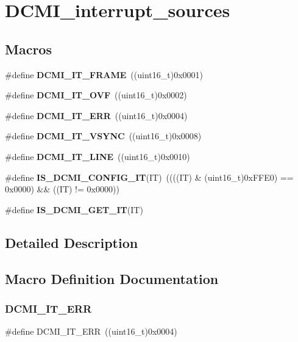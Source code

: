 \section{D\+C\+M\+I\+\_\+interrupt\+\_\+sources}
\label{group__DCMI__interrupt__sources}
\subsection*{Macros}
\begin{DoxyCompactItemize}
\item 
\#define \textbf{ D\+C\+M\+I\+\_\+\+I\+T\+\_\+\+F\+R\+A\+ME}~((uint16\+\_\+t)0x0001)
\item 
\#define \textbf{ D\+C\+M\+I\+\_\+\+I\+T\+\_\+\+O\+VF}~((uint16\+\_\+t)0x0002)
\item 
\#define \textbf{ D\+C\+M\+I\+\_\+\+I\+T\+\_\+\+E\+RR}~((uint16\+\_\+t)0x0004)
\item 
\#define \textbf{ D\+C\+M\+I\+\_\+\+I\+T\+\_\+\+V\+S\+Y\+NC}~((uint16\+\_\+t)0x0008)
\item 
\#define \textbf{ D\+C\+M\+I\+\_\+\+I\+T\+\_\+\+L\+I\+NE}~((uint16\+\_\+t)0x0010)
\item 
\#define \textbf{ I\+S\+\_\+\+D\+C\+M\+I\+\_\+\+C\+O\+N\+F\+I\+G\+\_\+\+IT}(IT)~((((IT) \& (uint16\+\_\+t)0x\+F\+F\+E0) == 0x0000) \&\& ((\+I\+T) != 0x0000))
\item 
\#define \textbf{ I\+S\+\_\+\+D\+C\+M\+I\+\_\+\+G\+E\+T\+\_\+\+IT}(IT)
\end{DoxyCompactItemize}


\subsection{Detailed Description}


\subsection{Macro Definition Documentation}
\mbox{\label{group__DCMI__interrupt__sources_gaef8a30c349bbe77a26052613053c0201}} 
\subsubsection{D\+C\+M\+I\+\_\+\+I\+T\+\_\+\+E\+RR}
{\footnotesize\ttfamily \#define D\+C\+M\+I\+\_\+\+I\+T\+\_\+\+E\+RR~((uint16\+\_\+t)0x0004)}



